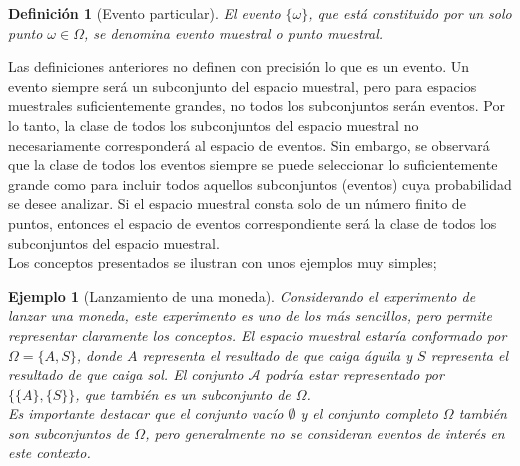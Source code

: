 \documentclass[12pt]{article}
\newtheorem*{example}{Ejemplo}
\newtheorem{definition}{Definición}
\begin{document}
\begin{definition}[Evento particular]
   El evento $\{\omega\}$, que está constituido por un solo punto $\omega \in \Omega$, se denomina \textit{evento muestral} o \textit{punto muestral}.
\end{definition}

Las definiciones anteriores no definen con precisión lo que es un evento. Un evento siempre será un subconjunto del espacio muestral, pero para espacios muestrales suficientemente grandes, no todos los subconjuntos serán eventos. Por lo tanto, la clase de todos los subconjuntos del espacio muestral no necesariamente corresponderá al espacio de eventos. Sin embargo, se observará que la clase de todos los eventos siempre se puede seleccionar lo suficientemente grande como para incluir todos aquellos subconjuntos (eventos) cuya probabilidad se desee analizar. Si el espacio muestral consta solo de un número finito de puntos, entonces el espacio de eventos correspondiente será la clase de todos los subconjuntos del espacio muestral.\\

Los conceptos presentados se ilustran con unos ejemplos muy simples;

\begin{example}[Lanzamiento de una moneda]
    Considerando el experimento de lanzar una moneda, este experimento es uno de los más sencillos, pero permite representar claramente los conceptos. El espacio muestral estaría conformado por $\Omega = \{A, S\}$, donde $A$ representa el resultado de que caiga águila y $S$ representa el resultado de que caiga sol. El conjunto $\mathscr{A}$ podría estar representado por $\{\{A\}, \{S\}\}$, que también es un subconjunto de $\Omega$.\\

Es importante destacar que el conjunto vacío $\emptyset$ y el conjunto completo $\Omega$ también son subconjuntos de $\Omega$, pero generalmente no se consideran eventos de interés en este contexto.
\end{example}
\end{document}

